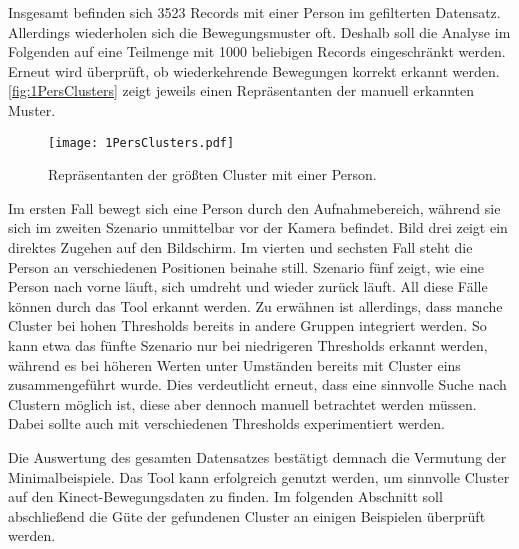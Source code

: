 Insgesamt befinden sich 3523 Records mit einer Person im gefilterten Datensatz.
Allerdings wiederholen sich die Bewegungsmuster oft.
Deshalb soll die Analyse im Folgenden auf eine Teilmenge mit 1000 beliebigen Records eingeschränkt werden.
Erneut wird überprüft, ob wiederkehrende Bewegungen korrekt erkannt werden.
\autoref{fig:1PersClusters} zeigt jeweils einen Repräsentanten der manuell erkannten Muster.
\begin{figure}[ht]
    \begin{center}
    \texttt{[image: 1PersClusters.pdf]}
    \end{center}
    \caption{Repräsentanten der größten Cluster mit einer Person.}
    \label{fig:1PersClusters}
\end{figure}
Im ersten Fall bewegt sich eine Person durch den Aufnahmebereich,
während sie sich im zweiten Szenario unmittelbar vor der Kamera befindet.
Bild drei zeigt ein direktes Zugehen auf den Bildschirm.
Im vierten und sechsten Fall steht die Person an verschiedenen Positionen beinahe still.
Szenario fünf zeigt, wie eine Person nach vorne läuft,
sich umdreht und wieder zurück läuft.
All diese Fälle können durch das Tool erkannt werden.
Zu erwähnen ist allerdings, dass manche Cluster bei hohen Thresholds bereits in andere Gruppen integriert werden.
So kann etwa das fünfte Szenario nur bei niedrigeren Thresholds erkannt werden,
während es bei höheren Werten unter Umständen bereits mit Cluster eins zusammengeführt wurde.
Dies verdeutlicht erneut, dass eine sinnvolle Suche nach Clustern möglich ist,
diese aber dennoch manuell betrachtet werden müssen.
Dabei sollte auch mit verschiedenen Thresholds experimentiert werden.

Die Auswertung des gesamten Datensatzes bestätigt demnach die Vermutung der Minimalbeispiele.
Das Tool kann erfolgreich genutzt werden, um sinnvolle Cluster auf den Kinect-Bewegungsdaten zu finden.
Im folgenden Abschnitt soll abschließend die Güte der gefundenen Cluster an einigen Beispielen
überprüft werden.


